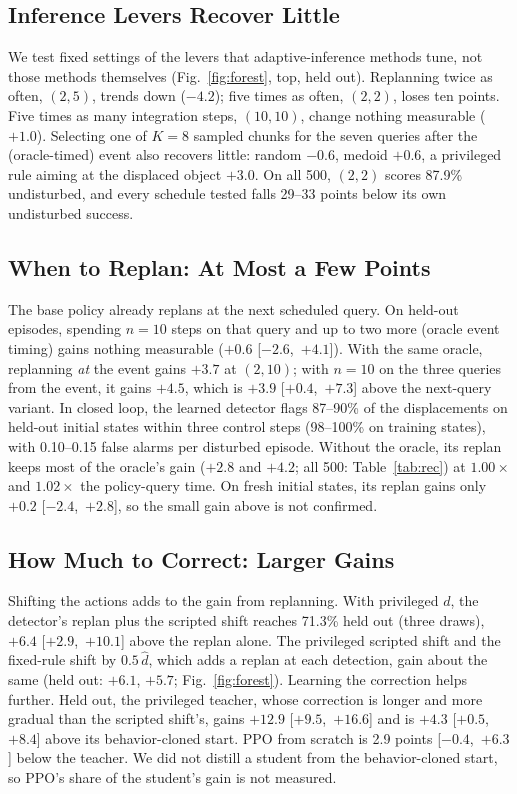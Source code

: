 \documentclass[conference,a4paper]{IEEEtran}
\begin{document}
\subsection{Inference Levers Recover Little}\label{sec:levers}
We test fixed settings of the levers that adaptive-inference methods tune, not those methods themselves (Fig.~\ref{fig:forest}, top, held out). Replanning twice as often, $(2,5)$, trends down ($-4.2$); five times as often, $(2,2)$, loses ten points. Five times as many integration steps, $(10,10)$, change nothing measurable ($+1.0$). Selecting one of $K=8$ sampled chunks for the seven queries after the (oracle-timed) event also recovers little: random $-0.6$, medoid $+0.6$, a privileged rule aiming at the displaced object $+3.0$. On all 500, $(2,2)$ scores 87.9\% undisturbed, and every schedule tested falls 29\nobreakdash--33 points below its own undisturbed success.

\subsection{When to Replan: At Most a Few Points}\label{sec:event}
The base policy already replans at the next scheduled query. On held-out episodes, spending $n=10$ steps on that query and up to two more (oracle event timing) gains nothing measurable ($+0.6$ [$-2.6$,~$+4.1$]). With the same oracle, replanning \emph{at} the event gains $+3.7$ at $(2,10)$; with $n=10$ on the three queries from the event, it gains $+4.5$, which is $+3.9$ [$+0.4$,~$+7.3$] above the next-query variant. In closed loop, the learned detector flags 87--90\% of the displacements on held-out initial states within three control steps (98--100\% on training states), with 0.10--0.15 false alarms per disturbed episode. Without the oracle, its replan keeps most of the oracle's gain ($+2.8$ and $+4.2$; all 500: Table~\ref{tab:rec}) at $1.00\times$ and $1.02\times$ the policy-query time. On fresh initial states, its replan gains only $+0.2$ [$-2.4$,~$+2.8$], so the small gain above is not confirmed.

\subsection{How Much to Correct: Larger Gains}\label{sec:correct}
Shifting the actions adds to the gain from replanning. With privileged $d$, the detector's replan plus the scripted shift reaches 71.3\% held out (three draws), $+6.4$ [$+2.9$,~$+10.1$] above the replan alone. The privileged scripted shift and the fixed-rule shift by $0.5\,\hat d$, which adds a replan at each detection, gain about the same (held out: $+6.1$, $+5.7$; Fig.~\ref{fig:forest}). Learning the correction helps further. Held out, the privileged teacher, whose correction is longer and more gradual than the scripted shift's, gains $+12.9$ [$+9.5$,~$+16.6$] and is $+4.3$ [$+0.5$,~$+8.4$] above its behavior-cloned start. PPO from scratch is 2.9 points [$-0.4$,~$+6.3$] below the teacher. We did not distill a student from the behavior-cloned start, so PPO's share of the student's gain is not measured.
\end{document}
